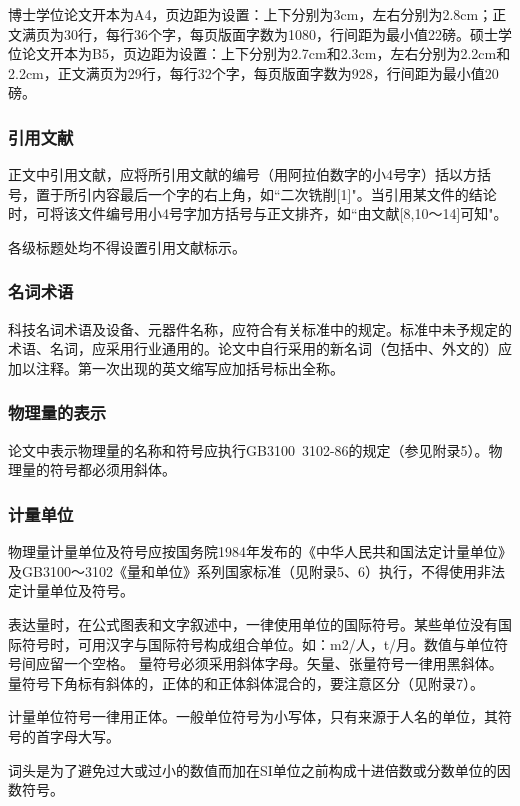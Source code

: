 博士学位论文开本为A4，页边距为设置：上下分别为3cm，左右分别为2.8cm；正文满页为30行，每行36个字，每页版面字数为1080，行间距为最小值22磅。硕士学位论文开本为B5，页边距为设置：上下分别为2.7cm和2.3cm，左右分别为2.2cm和2.2cm，正文满页为29行，每行32个字，每页版面字数为928，行间距为最小值20磅。

\subsubsection{引用文献}\label{appendixA-6-2-3} 
正文中引用文献，应将所引用文献的编号（用阿拉伯数字的小4号字）括以方括号，置于所引内容最后一个字的右上角，如``二次铣削[1]"。当引用某文件的结论时，可将该文件编号用小4号字加方括号与正文排齐，如``由文献[8,10～14]可知"。

各级标题处均不得设置引用文献标示。

\subsubsection{名词术语}\label{appendixA-6-2-4} 
科技名词术语及设备、元器件名称，应符合有关标准中的规定。标准中未予规定的术语、名词，应采用行业通用的。论文中自行采用的新名词（包括中、外文的）应加以注释。第一次出现的英文缩写应加括号标出全称。

\subsubsection{物理量的表示}\label{appendixA-6-2-5} 
论文中表示物理量的名称和符号应执行GB3100~3102-86的规定（参见附录5）。物理量的符号都必须用斜体。

\subsubsection{计量单位}\label{appendixA-6-2-6} 
物理量计量单位及符号应按国务院1984年发布的《中华人民共和国法定计量单位》及GB3100～3102《量和单位》系列国家标准（见附录5、6）执行，不得使用非法定计量单位及符号。

表达量时，在公式图表和文字叙述中，一律使用单位的国际符号。某些单位没有国际符号时，可用汉字与国际符号构成组合单位。如：m2/人，t/月。数值与单位符号间应留一个空格。
量符号必须采用斜体字母。矢量、张量符号一律用黑斜体。量符号下角标有斜体的，正体的和正体斜体混合的，要注意区分（见附录7）。

计量单位符号一律用正体。一般单位符号为小写体，只有来源于人名的单位，其符号的首字母大写。

词头是为了避免过大或过小的数值而加在SI单位之前构成十进倍数或分数单位的因数符号。

